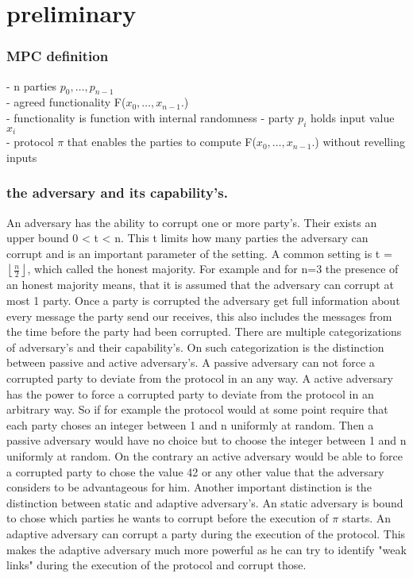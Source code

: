 \chapter{preliminary}
\subsection{MPC definition}
- n parties $ p_0,\dots,p_{n-1} $ \\
- agreed functionality F($ x_0,\dots,x_{n-1}. $) \\
- functionality is function with internal randomness 
- party $ p_i $ holds input value $ x_i $ \\
- protocol $ \pi $ that enables the parties to compute  F($ x_0,\dots,x_{n-1}. $) without revelling inputs \\ 





\subsection{the adversary and its capability's.}
 An adversary has the ability to corrupt one or more party's. Their exists an upper bound 0 < t < n. This t limits how many parties the adversary can corrupt and is an important parameter of the setting. A common setting is t = $\left \lfloor{ \frac{n}{2} }\right \rfloor  $, which called the honest majority. For example and for n=3 the presence of an honest majority means, that it is assumed that the adversary can corrupt at most 1 party.    
Once a party is corrupted the adversary get full information about every message the party send our receives, this also includes the messages from the time before the party had been corrupted. There are multiple categorizations of adversary's  and their capability's. On such categorization is the distinction between passive and active adversary's. A passive adversary can not force a corrupted party to deviate from the protocol in an any way. A active adversary has the power to force a corrupted party to deviate from the protocol in an arbitrary way. So if for example the protocol would at some point require that each party choses an integer between 1 and n uniformly at random.  Then a passive adversary would have no choice but to choose the integer between 1 and n uniformly at random. On the contrary an active adversary would be able to force a corrupted party to chose the value 42 or any other value that the adversary considers to be advantageous for him. Another important distinction is the distinction between static and adaptive adversary's. An static adversary is bound to chose which parties he wants to corrupt before the execution of $ \pi $ starts. An adaptive adversary can corrupt a party during the execution of the protocol. This makes the adaptive adversary much more powerful as he can try to identify "weak links" during the execution of the protocol and corrupt those.   





